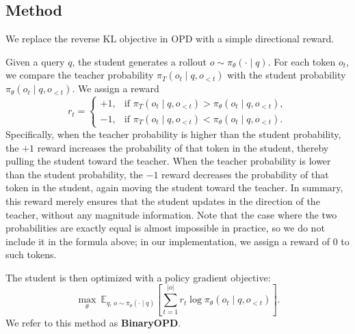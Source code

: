 \documentclass{article}
\theoremstyle{remark}
\begin{document}
\subsection{Method}
\label{sec:BinaryOPD-method}

We replace the reverse KL objective in OPD with a simple directional reward.

Given a query \(q\), the student generates a rollout \(o \sim \pi_\theta(\cdot \mid q)\). For each token \(o_t\), we compare the teacher probability \(\pi_T(o_t \mid q, o_{<t})\) with the student probability \(\pi_\theta(o_t \mid q, o_{<t})\). We assign a reward
\[
r_t =
\begin{cases}
+1, & \text{if } \pi_T(o_t \mid q, o_{<t}) > \pi_\theta(o_t \mid q, o_{<t}), \\[2pt]
-1, & \text{if } \pi_T(o_t \mid q, o_{<t}) < \pi_\theta(o_t \mid q, o_{<t}).
\end{cases}
\]
Specifically, when the teacher probability is higher than the student probability, the \(+1\) reward increases the probability of that token in the student, thereby pulling the student toward the teacher. When the teacher probability is lower than the student probability, the \(-1\) reward decreases the probability of that token in the student, again moving the student toward the teacher. In summary, this reward merely ensures that the student updates in the direction of the teacher, without any magnitude information. Note that the case where the two probabilities are exactly equal is almost impossible in practice, so we do not include it in the formula above; in our implementation, we assign a reward of \(0\) to such tokens.

The student is then optimized with a policy gradient objective:
\[
\max_{\theta} \ 
\mathbb{E}_{q, \, o \sim \pi_\theta(\cdot \mid q)}
\left[
\sum_{t=1}^{|o|} r_t \log \pi_\theta(o_t \mid q, o_{<t})
\right].
\]
We refer to this method as \textbf{BinaryOPD}.





\end{document}
